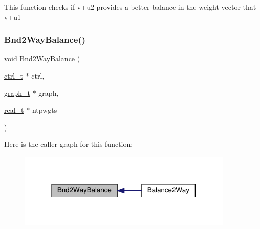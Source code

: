 This function checks if v+u2 provides a better balance in the weight vector that v+u1 \mbox{\label{a00945_ab06911b71a6e285ceb52bb80b6592e79}} 
\subsubsection{\texorpdfstring{Bnd2\+Way\+Balance()}{Bnd2WayBalance()}}
{\footnotesize\ttfamily void Bnd2\+Way\+Balance (\begin{DoxyParamCaption}\item[{\hyperlink{a00742}{ctrl\+\_\+t} $\ast$}]{ctrl,  }\item[{\hyperlink{a00734}{graph\+\_\+t} $\ast$}]{graph,  }\item[{\hyperlink{a00876_a1924a4f6907cc3833213aba1f07fcbe9}{real\+\_\+t} $\ast$}]{ntpwgts }\end{DoxyParamCaption})}

Here is the caller graph for this function\+:\nopagebreak
\begin{figure}[H]
\begin{center}
\leavevmode
\includegraphics[width=290pt]{a00945_ab06911b71a6e285ceb52bb80b6592e79_icgraph}
\end{center}
\end{figure}
\mbox{\label{a00945_a255cc560df2c972c98aaf88644587f6d}} 

